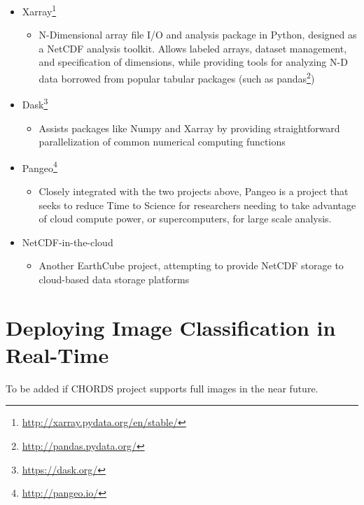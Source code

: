 \begin{itemize}
	\item Xarray\footnote{\url{http://xarray.pydata.org/en/stable/}}
	\begin{itemize}
		\item N-Dimensional array file I/O and analysis package in Python, designed as a NetCDF analysis toolkit. Allows labeled arrays, dataset management, and specification of dimensions, while providing tools for analyzing N-D data borrowed from popular tabular packages (such as pandas\footnote{\url{http://pandas.pydata.org/}})
	\end{itemize}
	\item Dask\footnote{\url{https://dask.org/}}
	\begin{itemize}
		\item Assists packages like Numpy and Xarray by providing straightforward parallelization of common numerical computing functions
	\end{itemize}
	\item Pangeo\footnote{\url{http://pangeo.io/}}
	\begin{itemize}
		\item Closely integrated with the two projects above, Pangeo is a project that seeks to reduce Time to Science for researchers needing to take advantage of cloud compute power, or supercomputers, for large scale analysis.
	\end{itemize}
	\item NetCDF-in-the-cloud
	\begin{itemize}
		\item Another EarthCube project, attempting to provide NetCDF storage to cloud-based data storage platforms
	\end{itemize}
\end{itemize}

\section{Deploying Image Classification in Real-Time}
\label{sec:realtime_classification}

To be added if CHORDS project supports full images in the near future.